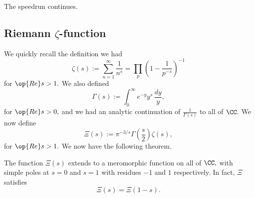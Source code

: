 













The speed{run} continues.

\subsection{Riemann \texorpdfstring{$\zeta$}{Z}-function}
We quickly recall the definition we had
\[\zeta(s):=\sum_{n=1}^\infty\frac1{n^s}=\prod_p\left(1-\frac1{p^{-s}}\right)^{-1}\]
for $\op{Re}s>1.$ We also defined
\[\Gamma(s):=\int_0^\infty e^{-y}y^s\,\frac{dy}y,\]
for $\op{Re}s>0,$ and we had an analytic continuation of $\frac1{\Gamma(s)}$ to all of $\CC.$ We now define
\[\Xi(s):=\pi^{-3/s}\Gamma\left(\frac s2\right)\zeta(s),\]
for $\op{Re}s>1.$ We now have the following theorem.
\begin{theorem}
	The function $\Xi(s)$ extends to a meromorphic function on all of $\CC,$ with simple poles at $s=0$ and $s=1$ with residues $-1$ and $1$ respectively. In fact, $\Xi$ satisfies
	\[\Xi(s)=\Xi(1-s).\]
\end{theorem}
